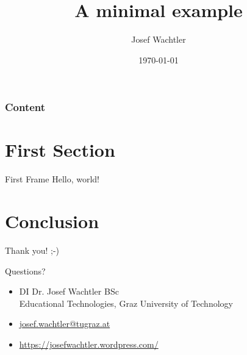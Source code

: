 \documentclass{beamer}
\title{A minimal example}
\date{\today}
\author{Josef Wachtler}
\institute{Educational Technologies, Graz University of Technology}
\begin{document}

\maketitle


\begin{frame}
  \frametitle{Content}
  \tableofcontents%
\end{frame}



\section{First Section}


\begin{frame}{First Frame}
Hello, world!
\end{frame}



\section{Conclusion}

\begin{frame}{Thank you! ;-)}
  
  \begin{center}
    \begin{huge}
      Questions?
    \end{huge}
  \end{center}
 
  \begin{itemize}
    \item DI Dr. Josef Wachtler BSc \\
    Educational Technologies, Graz University of Technology
    \item \href{mailto:josef.wachtler@tugraz.at}{josef.wachtler@tugraz.at} 
    \item \href{https://josefwachtler.wordpress.com/}{https://josefwachtler.wordpress.com/} 
  \end{itemize}
  

\end{frame}
\end{document}
